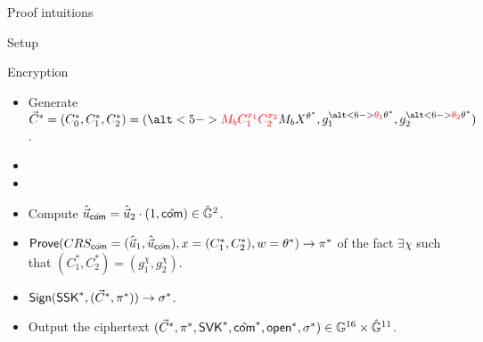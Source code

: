 \begin{frame}{Proof intuitions}
\begin{block}{Setup}
{\begin{itemize}
              \end{itemize}
            }
  \end{block}
      Encryption
    \begin{itemize}
    \item Generate $\vec{C}^* = (C_0^*, C_1^*, C_2^*) = (\alt<5->{{\color{red}M_bC_1^{x_1}C_2^{x_2}}}{ M_bX^{\theta^*}}, g_1^{\alt<6->{{\color{red}\theta_1}}{\theta^*}},  g_2^{\alt<6->{{\color{red}\theta_2}}{\theta^*}})$.
    \item {}
    \item {}
    \item Compute $\hat{\vec{u}}_{\hat{\mathsf{com}}} = \hat{\vec{u}}_2 \cdot (1, \hat{\mathsf{com}}) \in \hat{\mathbb{G}}^2$.	
    \item ${\mathsf{Prove}}(CRS_{\hat{\mathsf{com}}}= (\hat{\vec{u}}_1, \hat{\vec{u}}_{\hat{\mathsf{com}}}), x = (C_1^*, C_2^*), w = \theta^*) \to \pi^*$ of the fact $\exists \chi$ such that $(C_1^*, C_2^*) = (g_1^\chi, g_2^\chi)$.
    \item ${\mathsf{Sign}}(\mathsf{SSK}^*,(\vec{C}^*,\pi^*)) \to \sigma^*$.
    \item Output the ciphertext $(\vec{C}^*, \pi^*, \mathsf{SVK}^*, \hat{\mathsf{com}}^*, \mathsf{open}^*, \sigma^*) \in \mathbb{G}^{16} \times \hat{\mathbb{G}}^{11}$.
    \end{itemize}

\end{frame}
